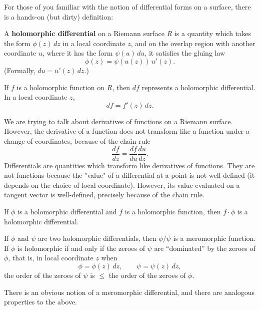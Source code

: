 \documentclass[12pt]{article}
\begin{document}
For those of you familiar with the notion of differential forms on a surface, there is a hands-on (but dirty) definition:

\begin{definition}
A \textbf{holomorphic differential} on a Riemann surface $R$ is a quantity which takes the form $\phi(z)\,dz$ in a local coordinate $z$, and on the overlap region with another coordinate $u$, where it has the form $\psi(u)\,du$, it satisfies the gluing law
\[
\phi(z) = \psi(u(z))\,u'(z).
\]
(Formally, $du = u'(z)\,dz$.)
\end{definition}

\begin{proposition}
If $f$ is a holomorphic function on $R$, then $df$ represents a holomorphic differential.  
In a local coordinate $z$,
\[
df = f'(z)\,dz.
\]
\end{proposition}

\begin{remark}
We are trying to talk about derivatives of functions on a Riemann surface.  
However, the derivative of a function does not transform like a function under a change of coordinates, because of the chain rule
\[
\frac{df}{dz} = \frac{df}{du} \frac{du}{dz}.
\]
Differentials are quantities which transform like derivatives of functions. They are not functions because the "value" of a differential at a point is not well-defined (it depends on the choice of local coordinate). However, its value evaluated on a tangent vector is well-defined, precisely because of the chain rule.
\end{remark}

\begin{proposition}
If $\phi$ is a holomorphic differential and $f$ is a holomorphic function, then $f \cdot \phi$ is a holomorphic differential.
\end{proposition}

If $\phi$ and $\psi$ are two holomorphic differentials, then $\phi/\psi$ is a meromorphic function.  
If $\phi$ is holomorphic if and only if the zeroes of $\psi$ are “dominated” by the zeroes of $\phi$, that is, in local coordinate $z$ when
\[
\phi = \phi(z)\,dz, \qquad \psi = \psi(z)\,dz,
\]
the order of the zeroes of $\psi$ is $\le$ the order of the zeroes of $\phi$.

\begin{remark}
There is an obvious notion of a meromorphic differential, and there are analogous properties to the above.
\end{remark}
\end{document}
